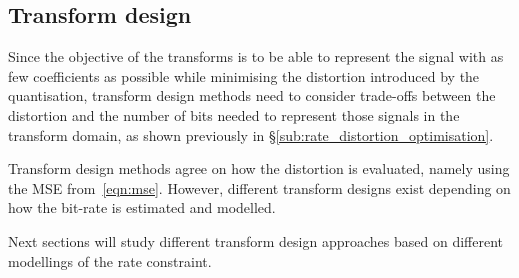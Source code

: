 \documentclass[11pt,a4paper,openright,twoside]{book}
\numberwithin{equation}{section} %
\numberwithin{figure}{section} %
\numberwithin{table}{section} %
\begin{document}
\subsection{Transform design}
\label{sub:transform_design}

Since the objective of the transforms is to be able to represent the signal
with as few coefficients as possible while minimising the distortion
introduced by the quantisation, transform design methods need to consider
trade-offs between the distortion and the number of bits needed to represent
those signals in the transform domain, as shown previously in
\S\ref{sub:rate_distortion_optimisation}.

Transform design methods agree on how the distortion is evaluated, namely
using the \ac{MSE} from~\eqref{eqn:mse}.
However, different transform designs exist depending on how the bit-rate is
estimated and modelled.

Next sections will study different transform design approaches based on
different modellings of the rate constraint.
\end{document}
